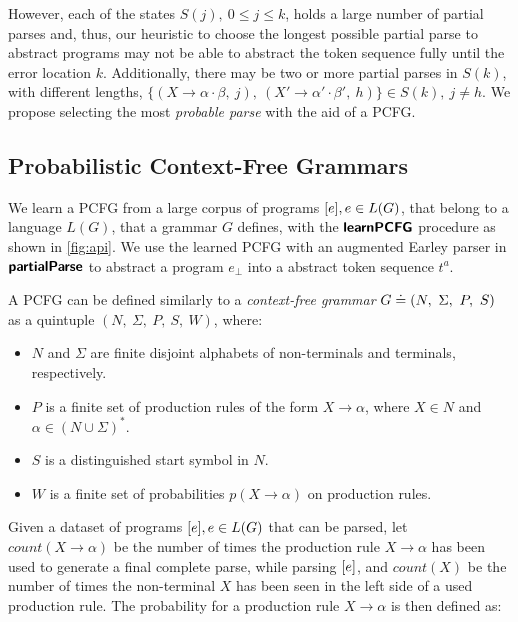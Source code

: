 %
However, each of the states $S(j),\ 0 \leq j \leq k$, holds a large number of
partial parses and, thus, our heuristic to choose the longest possible partial
parse to abstract programs may not be able to abstract the token sequence fully
until the error location $k$. Additionally, there may be two or more partial
parses in $S(k)$, with different lengths, \eg $\{(X \rightarrow \alpha \cdot
\beta,\ j),\ (X' \rightarrow \alpha' \cdot \beta',\ h)\} \in S(k),\ j \neq h$.
We propose selecting the most \emph{probable parse} with the aid of a PCFG.


\subsection{Probabilistic Context-Free Grammars}
\label{sec:prog-abstract:pcfg}
We learn a PCFG from a large corpus of programs $[e], e \in L(G)$, that
belong to a language $L(G)$, that a grammar $G$ defines, with the
$\bm{\mathsf{learnPCFG}}$ procedure as shown in \autoref{fig:api}. We use the learned PCFG
with an augmented Earley parser in $\bm{\mathsf{partialParse}}$ to abstract a program
$e_{\bot}$ into a abstract token sequence $t^a$.

%
A PCFG can be defined similarly to a \emph{context-free grammar} $G \doteq (N,\
\Sigma,\ P,\ S)$ as a quintuple $(N,\ \Sigma,\ P,\ S,\ W)$, where:
\begin{itemize}
    \item $N$ and $\Sigma$ are finite disjoint alphabets of non-terminals and
    terminals, respectively.
    \item $P$ is a finite set of production rules of the form $X \rightarrow
    \alpha$, where $X \in N$ and $\alpha \in (N \cup \Sigma)^{\ast}$.
    \item $S$ is a distinguished start symbol in $N$.
    \item $W$ is a finite set of probabilities $p(X \rightarrow \alpha)$ on
    production rules.
\end{itemize}

Given a dataset of programs $[e], e \in L(G)$ that can be parsed, let
$count(X \rightarrow \alpha)$ be the number of times the production rule $X
\rightarrow \alpha$ has been used to generate a final complete parse, while
parsing $[e]$, and $count(X)$ be the number of times the non-terminal $X$
has been seen in the left side of a used production rule. The probability for a
production rule $X \rightarrow \alpha$ is then defined as:

